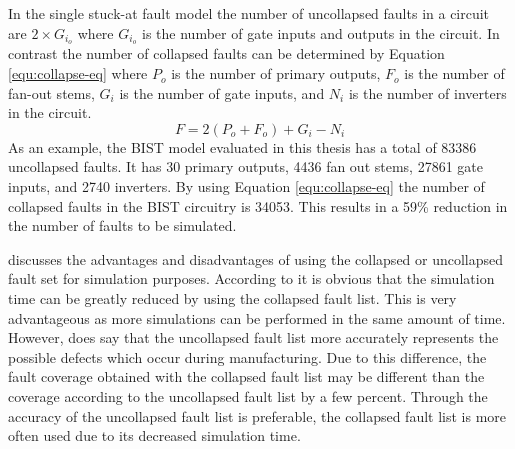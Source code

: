 \documentclass[12pt]{report}
\begin{document}
In the single stuck-at fault model the number of uncollapsed faults in a circuit are $2 \times G_i_o$ where $G_i_o$ is the number of gate inputs and outputs in the circuit\cite{stroud}.  In contrast the number of collapsed faults can be determined by Equation \ref{equ:collapse-eq} where $P_o$ is the number of primary outputs, $F_o$ is the number of fan-out stems, $G_i$ is the number of gate inputs, and $N_i$ is the number of inverters in the circuit\cite{stroud}.
\begin{equation}
F = 2(P_o + F_o) + G_i - N_i
\label{equ:collapse-eq}
\end{equation}
As an example, the BIST model evaluated in this thesis has a total of 83386 uncollapsed faults.  It has 30 primary outputs, 4436 fan out stems, 27861 gate inputs, and 2740 inverters.  By using Equation \ref{equ:collapse-eq} the number of collapsed faults in the BIST circuitry is 34053.  This results in a 59\% reduction in the number of faults to be simulated.  

\cite{stroud} discusses the advantages and disadvantages of using the collapsed or uncollapsed fault set for simulation purposes.  According to \cite{stroud} it is obvious that the simulation time can be greatly reduced by using the collapsed fault list.  This is very advantageous as more simulations can be performed in the same amount of time.  However, \cite{stroud} does say that the uncollapsed fault list more accurately represents the possible defects which occur during manufacturing.  Due to this difference, the fault coverage obtained with the collapsed fault list may be different than the coverage according to the uncollapsed fault list by a few percent\cite{stroud}.  Through the accuracy of the uncollapsed fault list is preferable, the collapsed fault list is more often used due to its decreased simulation time\cite{stroud}.
\end{document}
